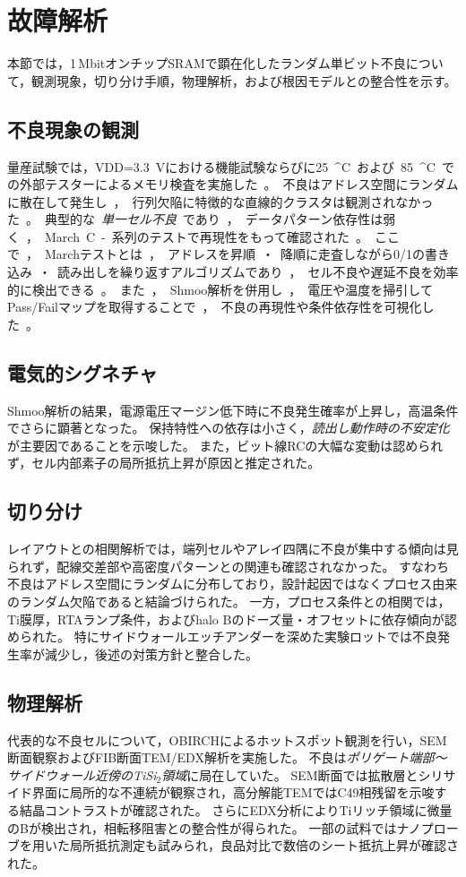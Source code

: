 \documentclass[conference]{IEEEtran}
\begin{document}
\section{故障解析}
本節では，1\,MbitオンチップSRAMで顕在化したランダム単ビット不良について，観測現象，切り分け手順，物理解析，および根因モデルとの整合性を示す。

\subsection{不良現象の観測}
量産試験では，VDD=\SI{3.3}{V}における機能試験ならびに\SI{25}{^\circ C}および\SI{85}{^\circ C}での外部テスターによるメモリ検査を実施した。  
不良はアドレス空間にランダムに散在して発生し，行列欠陥に特徴的な直線的クラスタは観測されなかった。  
典型的な\emph{単一セル不良}であり，データパターン依存性は弱く，March C-系列のテストで再現性をもって確認された。  

ここで，Marchテストとは，アドレスを昇順・降順に走査しながら0/1の書き込み・読み出しを繰り返すアルゴリズムであり，セル不良や遅延不良を効率的に検出できる。  
また，Shmoo解析を併用し，電圧や温度を掃引してPass/Failマップを取得することで，不良の再現性や条件依存性を可視化した。

\subsection{電気的シグネチャ}
Shmoo解析の結果，電源電圧マージン低下時に不良発生確率が上昇し，高温条件でさらに顕著となった。  
保持特性への依存は小さく，\emph{読出し動作時の不安定化}が主要因であることを示唆した。  
また，ビット線RCの大幅な変動は認められず，セル内部素子の局所抵抗上昇が原因と推定された。

\subsection{切り分け}
レイアウトとの相関解析では，端列セルやアレイ四隅に不良が集中する傾向は見られず，配線交差部や高密度パターンとの関連も確認されなかった。  
すなわち不良はアドレス空間にランダムに分布しており，設計起因ではなくプロセス由来のランダム欠陥であると結論づけられた。  
一方，プロセス条件との相関では，Ti膜厚，RTAランプ条件，およびhalo Bのドーズ量・オフセットに依存傾向が認められた。  
特にサイドウォールエッチアンダーを深めた実験ロットでは不良発生率が減少し，後述の対策方針と整合した。

\subsection{物理解析}
代表的な不良セルについて，OBIRCHによるホットスポット観測を行い，SEM断面観察およびFIB断面TEM/EDX解析を実施した。  
不良は\emph{ポリゲート端部〜サイドウォール近傍のTiSi$_2$領域}に局在していた。  
SEM断面では拡散層とシリサイド界面に局所的な不連続が観察され，高分解能TEMではC49相残留を示唆する結晶コントラストが確認された。  
さらにEDX分析によりTiリッチ領域に微量のBが検出され，相転移阻害との整合性が得られた。  
一部の試料ではナノプローブを用いた局所抵抗測定も試みられ，良品対比で数倍のシート抵抗上昇が確認された。
\end{document}
